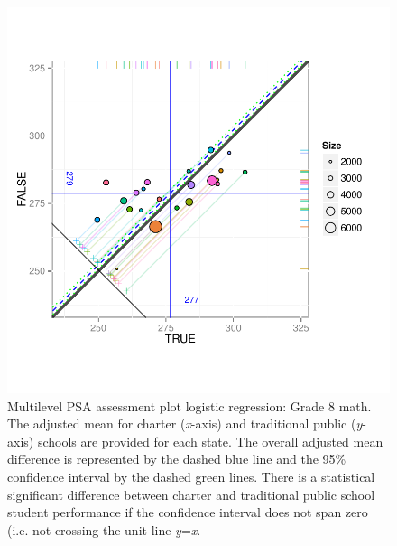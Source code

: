 \begin{figure}[h!]
\begin{center}
\includegraphics[width=\textwidth,trim=0 .6in 0 .6in]{../Figures2009/g8math-mlpsa-lr-circ.pdf}
\caption[Multilevel PSA assessment plot logistic regression: Grade 8 math]{Multilevel PSA assessment plot logistic regression: Grade 8 math. The adjusted mean for charter (\textit{x}-axis) and traditional public (\textit{y}-axis) schools are provided for each state. The overall adjusted mean difference is represented by the dashed blue line and the 95\% confidence interval by the dashed green lines. There is a statistical significant difference between charter and traditional public school student performance if the confidence interval does not span zero (i.e. not crossing the unit line \textit{y}=\textit{x}.}
\end{center}
\end{figure}

